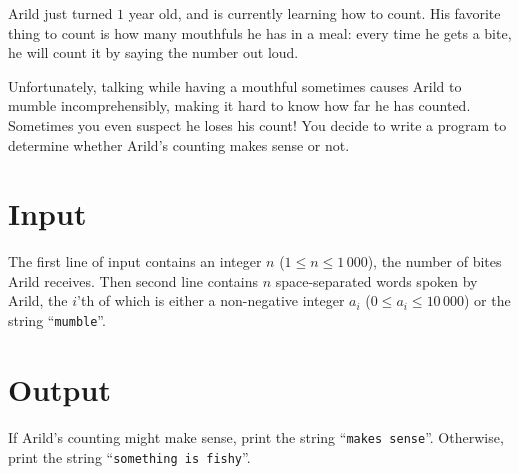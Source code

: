 
%
\noindent
Arild just turned $1$ year old, and is currently learning how to count. His favorite thing to count is how many mouthfuls he has in a meal: every time he gets a bite, he will count it by saying the number out loud.

Unfortunately, talking while having a mouthful sometimes causes Arild to mumble incomprehensibly, making it hard to know how far he has counted. Sometimes you even suspect he loses his count! You decide to write a program to determine whether Arild's counting makes sense or not.

\section*{Input}

The first line of input contains an integer $n$ ($1 \le n \le 1\,000$), the number of bites Arild receives. Then second line contains $n$ space-separated words spoken by Arild, the $i$'th of which is either a non-negative integer $a_i$ ($0 \le a_i \le 10\,000$) or the string ``\texttt{mumble}''.


\section*{Output}
If Arild's counting might make sense, print the string ``\texttt{makes sense}''. Otherwise, print the string ``\texttt{something is fishy}''.
